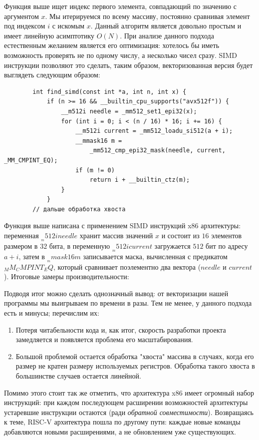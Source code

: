 \documentclass[a4paper, 12pt]{article}
\begin{document}
    Функция выше ищет индекс первого элемента, совпадающий по значению с аргументом $x$. Мы итерируемся
    по всему массиву, постоянно сравнивая элемент под индексом $i$ с искомым $x$. Данный алгоритм является
    довольно простым и имеет линейную асимптотику $O (N)$. При анализе данного подхода естественным желанием
    является его оптимизация: хотелось бы иметь возможность проверять не по одному числу, а несколько чисел
    сразу. SIMD инструкции позволяют это сделать, таким образом, векторизованная версия будет выглядеть
    следующим образом:

    \begin{lstlisting}
        int find_simd(const int *a, int n, int x) {
            if (n >= 16 && __builtin_cpu_supports("avx512f")) {
                __m512i needle = _mm512_set1_epi32(x);
                for (int i = 0; i < (n / 16) * 16; i += 16) {
                    __m512i current = _mm512_loadu_si512(a + i);
                    __mmask16 m =
                        _mm512_cmp_epi32_mask(needle, current, _MM_CMPINT_EQ);
                    if (m != 0)
                        return i + __builtin_ctz(m);
                }
            }
        // дальше обработка хвоста
    \end{lstlisting}

    Функция выше написана с применением SIMD инструкций x86 архитектуры: переменная $__m512i needle$ хранит массив
    значений $x$ и состоит из $16$ элементов размером в $32$ бита, в переменную $__m512i current$ загружается $512$
    бит по адресу $a + i$, затем в $__mmask16 m$ записывается маска, вычисленная с предикатом $_MM_CMPINT_EQ$, который
    сравнивает поэлементно два вектора ($needle$ и $current$). Итоговые замеры производительности:
    
    
    Подводя итог можно сделать однозначный вывод: от векторизации нашей программы мы выигрываем по времени в разы. Тем
    не менее, у данного подхода есть и минусы; перечислим их:

    \begin{enumerate}
        \item Потеря читабельности кода и, как итог, скорость разработки проекта замедляется и появляется проблема его
        масштабирования.
        \item Большой проблемой остается обработка "хвоста" массива в случаях, когда его размер не кратен размеру
        используемых регистров. Обработка такого хвоста в большинстве случаев остается линейной.
    \end{enumerate}

    Помимо этого стоит так же отметить, что архитектура x86 имеет огромный набор инструкций: при каждом последующем
    расширении возможностей архитектуры устаревшие инструкции остаются (ради \textit {обратной совместимости}). Возвращаясь
    к теме, RISC-V архитектура пошла по другому пути: каждые новые команды добавляются новыми расширениями, а не обновлением
    уже существующих.


\end{document}

